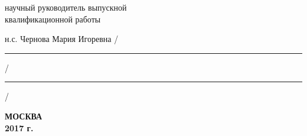 \noindent
научный руководитель выпускной \\
квалификационной работы

\noindent
н.с. Чернова Мария Игоревна
\hfill /\rule{6em}{0.5pt}/\rule{6em}{0.5pt}/

\hfill{}

%
%

\vfill

\begin{center}
\normalsize \bfseries МОСКВА \\ 2017 г.
\end{center}
\endgroup 
